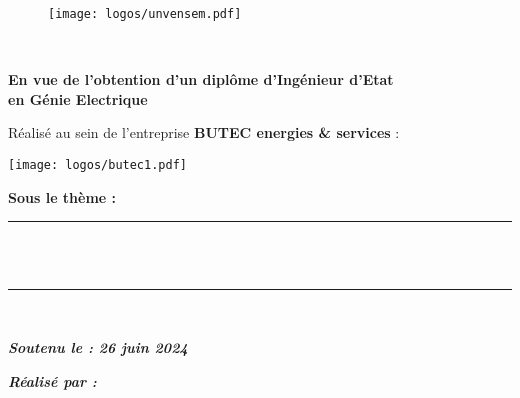 \begin{titlepage}
	
	\begin{figure}
		\begin{center}
			
			\texttt{[image: logos/unvensem.pdf]}
		\end{center}
	\end{figure}
	
	
	
	
	\begin{center}
		
		\large \textbf{\mention}\\ \vspace{0.3cm}
		
		\large\textbf {En vue de l’obtention d’un diplôme d’Ingénieur d’Etat  \\en Génie Electrique}\\ \vspace{0.4cm}
		\large \textbf{   \filiere } 
		
		
		
	\end{center}
	 Réalisé au sein de l’entreprise \textbf{BUTEC energies \& services} :
	\begin{center}
		
		
		\texttt{[image: logos/butec1.pdf]}
	\end{center}
\textbf{Sous le thème :}
	
	\begin{center}
		
		
		\vspace{0.1cm}\rule{\linewidth}{0.2 mm} \\[0.4 cm]
		{\Large \bfseries \titre } \
		\rule{\linewidth}{0.2 mm} \\[1.0 cm]
		
		
		
		
		
		{\textbf{\emph{Soutenu le : 26 juin 2024}} \\ \par} 
	\end{center}
\hfill
		\begin{minipage}[t]{0.3\textwidth}
			\textbf{\emph{Réalisé par :}}\\ 
			\begin{tabular}{>{\bfseries}l}
				

\end{tabular}
\end{minipage}
\end{titlepage}
